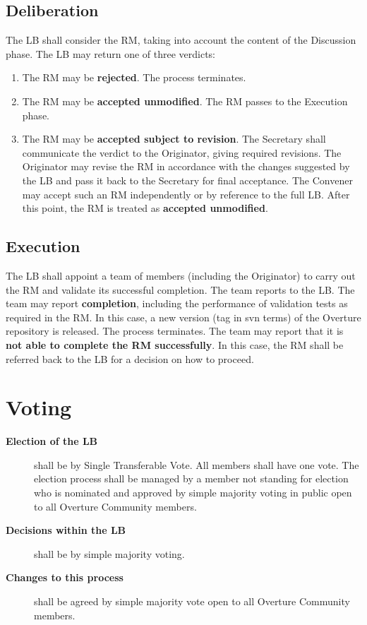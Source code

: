 \documentclass[]{article}
\begin{document}
\subsection{Deliberation} %
\label{sub:deliberation_of_a_request_for_modifiation}
The LB shall consider the RM, taking into account the content of the
Discussion phase. The LB may return one of three verdicts:
\begin{enumerate}
\item The RM may be \textbf{rejected}. The process terminates. 
\item The RM may be \textbf{accepted unmodified}. The RM passes to the
  Execution phase.
\item The RM may be \textbf{accepted subject to revision}. The
  Secretary shall communicate the verdict to the Originator, giving
  required revisions. The Originator may revise the RM in
  accordance with the changes suggested by the LB and pass it back to
  the Secretary for final acceptance. The Convener may accept such an
  RM independently or by reference to the full LB. After this point,
  the RM is treated as \textbf{accepted unmodified}.
\end{enumerate}

\subsection{Execution} %
\label{sub:execution}

The LB shall appoint a team of members (including the Originator) to
carry out the RM and validate its successful completion. The team
reports to the LB.  The team may report \textbf{completion}, including
the performance of validation tests as required in the RM. In this
case, a new version (tag in svn terms) of the Overture repository is
released. The process terminates.  The team may report that it is
\textbf{not able to complete the RM successfully}. In this case, the
RM shall be referred back to the LB for a decision on how to proceed.

\section{Voting} %
\label{sub:voting}
\begin{description}
\item[\textbf{Election of the LB}] shall be by Single Transferable Vote. All
members shall have one vote. The election process shall be managed by
a member not standing for election who is nominated and approved by
simple majority voting in public open to all Overture Community members. 

\item[\textbf{Decisions within the LB}] shall be by simple majority
voting. 

\item[\textbf{Changes to this process}] shall be agreed by simple majority
vote open to all Overture Community members. 
\end{description}
\end{document}
